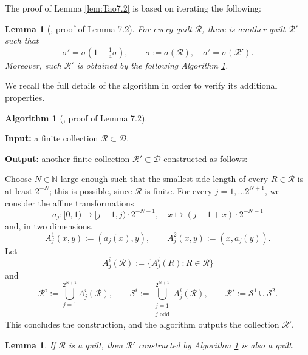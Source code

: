 \documentclass[11pt, reqno]{amsart}
\newtheorem{lemma}[theorem]{Lemma}
\theoremstyle{definition}
\newtheorem{algorithm}[theorem]{Algorithm}
\theoremstyle{remark}
\numberwithin{equation}{section}
\newcommand{\N}{\mathbb N}
\begin{document}
The proof of Lemma \ref{lem:Tao7.2} is based on iterating the following:

\begin{lemma}[\cite{Tao}, proof of Lemma 7.2]\label{lem:Carleson}
For every quilt $\mathscr R$, there is another quilt $\mathscr R'$ such that
\begin{equation*}
  \sigma'=\sigma(1-\tfrac14\sigma),\qquad\sigma:=\sigma(\mathscr R),\quad
  \sigma'=\sigma(\mathscr R').
\end{equation*}
Moreover, such $\mathscr R'$ is obtained by the following Algorithm \ref{algo:quilt}.
\end{lemma}

We recall the full details of the algorithm in order to verify its additional properties.

\begin{algorithm}[\cite{Tao}, proof of Lemma 7.2]\label{algo:quilt}\mbox{}

{\bf Input:} a finite collection $\mathscr R\subset\mathscr D$.

{\bf Output:} another finite collection $\mathscr R'\subset\mathscr D$ constructed as follows:

Choose $N\in\N$ large enough such that the smallest side-length of every $R\in\mathscr R$ is at least $2^{-N}$; this is possible, since $\mathscr R$ is finite. For every $j=1,\ldots 2^{N+1}$, we consider the affine transformations
\begin{equation*}
  a_j:[0,1)\to[j-1,j)\cdot 2^{-N-1},\quad x\mapsto (j-1+x)\cdot 2^{-N-1}
\end{equation*}
and, in two dimensions,
\begin{equation*}
  A_j^1(x,y):=(a_j(x),y),\qquad A_j^2(x,y):=(x,a_j(y)).
\end{equation*}
Let
\begin{equation*}
  A_j^i(\mathscr R):=\{ A_j^i(R):R\in\mathscr R\}
\end{equation*}
and
\begin{equation*}
  \mathscr R^i:=\bigcup_{j=1}^{2^{N+1}}  A_j^i(\mathscr R),\qquad
  \mathscr S^i:=\bigcup_{\substack{j=1 \\ j\text{ odd}}}^{2^{N+1}}  A_j^i(\mathscr R),\qquad
  \mathscr R':=\mathscr S^1\cup\mathscr S^2.
\end{equation*}
This concludes the construction, and the algorithm outputs the collection $\mathscr R'$.
\end{algorithm}

\begin{lemma}\label{lem:algo}
If $\mathscr R$ is a quilt, then $\mathscr R'$ constructed by Algorithm \ref{algo:quilt} is also a quilt.
\end{lemma}
\end{document}
